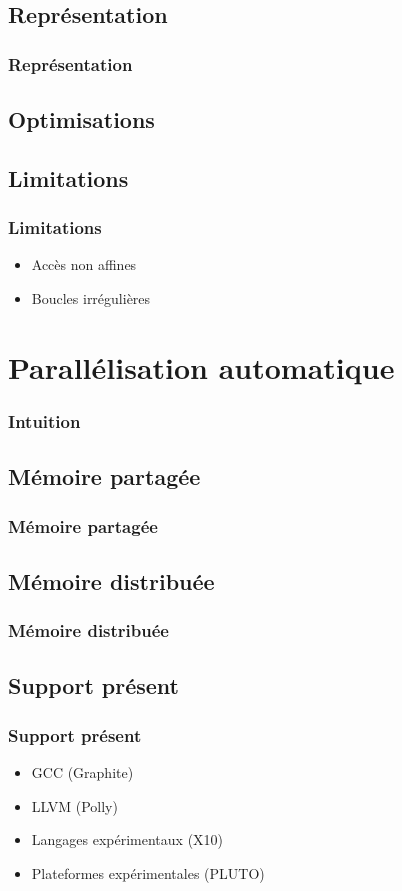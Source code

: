 \documentclass{beamer}
\begin{document}
\subsection{Représentation}
\begin{frame}
\frametitle{Représentation}

\end{frame}

\subsection{Optimisations}

\subsection{Limitations}
\begin{frame}
\frametitle{Limitations}
\begin{itemize}
\item Accès non affines
\item Boucles irrégulières
\end{itemize}
\end{frame}

\section{Parallélisation automatique}
\begin{frame}
\frametitle{Intuition}

\end{frame}

\subsection{Mémoire partagée}
\begin{frame}
\frametitle{Mémoire partagée}

\end{frame}

\subsection{Mémoire distribuée}
\begin{frame}
\frametitle{Mémoire distribuée}

\end{frame}

\subsection{Support présent}
\begin{frame}
\frametitle{Support présent}
\begin{itemize}
\item GCC (Graphite)
\item LLVM (Polly)
\item Langages expérimentaux (X10)
\item Plateformes expérimentales (PLUTO)
\end{itemize}
\end{frame}
\end{document}
